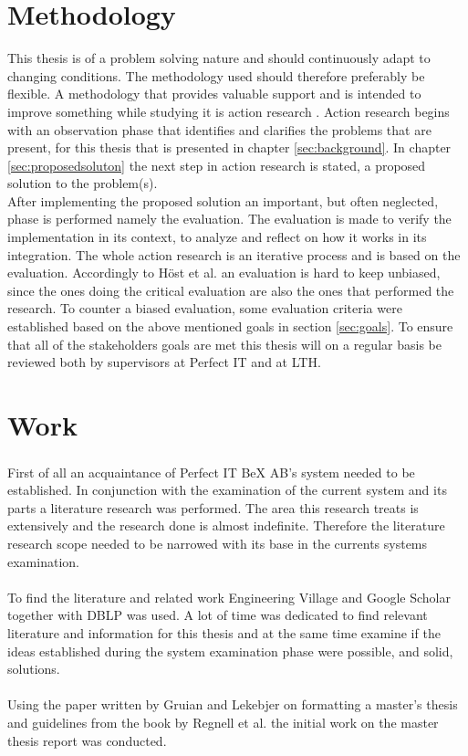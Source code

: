 \documentclass{cslthse-msc}
\newcommand{\bex}{BeX\textsuperscript{\textregistered} }
\begin{document}
\section{Methodology}
This thesis is of a problem solving nature and should continuously adapt to changing conditions. The methodology used should therefore preferably be flexible. A methodology that provides valuable support and is intended to improve something while studying it is action research \cite{robson}. Action research begins with an observation phase that identifies and clarifies the problems that are present, for this thesis that is presented in chapter \ref{sec:background}. In chapter \ref{sec:proposedsoluton} the next step in action research is stated, a proposed solution to the problem(s).\\

After implementing the proposed solution an important, but often neglected, phase is performed namely the evaluation. The evaluation is made to verify the implementation in its context, to analyze and reflect on how it works in its integration. The whole action research is an iterative process and is based on the evaluation. Accordingly to Höst et al. \cite{regnell} an evaluation is hard to keep unbiased, since the ones doing the critical evaluation are also the ones that performed the research. To counter a biased evaluation, some evaluation criteria were established based on the above mentioned goals in section \ref{sec:goals}. To ensure that all of the stakeholders goals are met this thesis will on a regular basis be reviewed both by supervisors at Perfect IT and at LTH.

\section{Work}
First of all an acquaintance of Perfect IT \bex AB's system needed to be established. In conjunction with the examination of the current system and its parts a literature research was performed. The area this research treats is extensively and the research done is almost indefinite. Therefore the literature research scope needed to be narrowed with its base in the currents systems examination.\\\\    
To find the literature and related work Engineering Village \cite{Enginvillage} and Google Scholar \cite{Googlescholar} together with DBLP \cite{DBLP} was used. A lot of time was dedicated to find relevant literature and information for this thesis and at the same time examine if the ideas established during the system examination phase were possible, and solid, solutions.\\\\
Using the paper written by Gruian and Lekebjer on formatting a master’s thesis \cite{Reportmall} and guidelines from the book by Regnell et al. \cite{regnell} the initial work on the master thesis report was conducted. 
\end{document}
